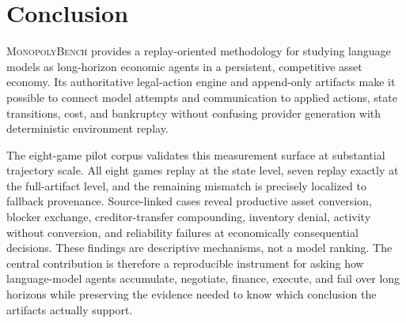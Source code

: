 \documentclass[conference]{IEEEtran}
\newcommand{\Bench}{\textsc{MonopolyBench}\xspace}
\begin{document}
\section{Conclusion}
\label{sec:conclusion}

\Bench provides a replay-oriented methodology for studying language models as long-horizon economic agents in a persistent, competitive asset economy. Its authoritative legal-action engine and append-only artifacts make it possible to connect model attempts and communication to applied actions, state transitions, cost, and bankruptcy without confusing provider generation with deterministic environment replay.

The eight-game pilot corpus validates this measurement surface at substantial trajectory scale. All eight games replay at the state level, seven replay exactly at the full-artifact level, and the remaining mismatch is precisely localized to fallback provenance. Source-linked cases reveal productive asset conversion, blocker exchange, creditor-transfer compounding, inventory denial, activity without conversion, and reliability failures at economically consequential decisions. These findings are descriptive mechanisms, not a model ranking. The central contribution is therefore a reproducible instrument for asking how language-model agents accumulate, negotiate, finance, execute, and fail over long horizons while preserving the evidence needed to know which conclusion the artifacts actually support.
\end{document}
